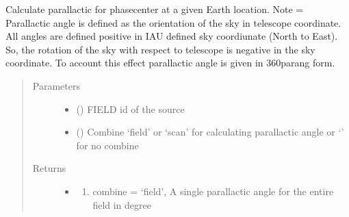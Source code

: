 \documentclass[letterpaper,10pt,english]{sphinxmanual}
\begin{document}
\begin{fulllineitems}
\begin{fulllineitems}
\begin{quote}
\begin{description}
\begin{itemize}
\end{itemize}


\end{description}\end{quote}

\end{fulllineitems}


\begin{fulllineitems}
\label{\detokenize{paircars:paircars.access_ms.AccessMS.get_phasecenter_parang}}
\sphinxAtStartPar
Calculate parallactic for phasecenter at a given Earth location.
Note = Parallactic angle is defined as the orientation of the sky in telescope coordinate. All angles are defined positive in IAU defined sky coordiunate (North to East).
So, the rotation of the sky with respect to telescope is negative in the sky coordinate. To account this effect parallactic angle is given in 360\sphinxhyphen{}parang form.
\begin{quote}\begin{description}
\item[{Parameters}] \leavevmode\begin{itemize}
\item {} 
\sphinxAtStartPar
{} () \textendash{} FIELD id of the source

\item {} 
\sphinxAtStartPar
{} () \textendash{} Combine ‘field’ or ‘scan’  for calculating parallactic angle or ‘’ for no combine

\end{itemize}

\item[{Returns}] \leavevmode
\sphinxAtStartPar
\begin{itemize}
\item {} 
\sphinxAtStartPar
{} \textendash{}
\begin{enumerate}
%
\item {} 
\sphinxAtStartPar
combine = ‘field’, A single parallactic angle for the entire field in degree


\end{enumerate}
\end{itemize}
\end{description}
\end{quote}
\end{fulllineitems}
\end{fulllineitems}
\end{document}
